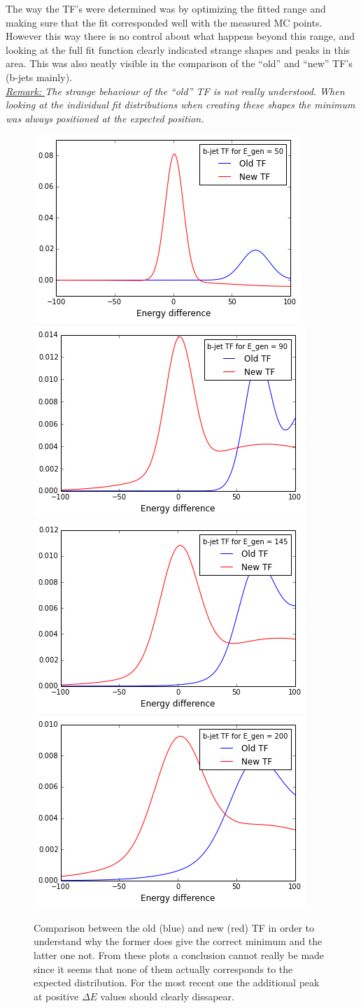 The way the TF's were determined was by optimizing the fitted range and making sure that the fit corresponded well with the measured MC points. However this way there is no control about what happens beyond this range, and looking at the full fit function clearly indicated strange shapes and peaks in this area. This was also neatly visible in the comparison of the ``old'' and ``new'' TF's (b-jets mainly). 
\\
\textit{ \underline{Remark: } The strange behaviour of the ``old'' TF is not really understood. When looking at the individual fit distributions when creating these shapes the minimum was always positioned at the expected position.}
\begin{figure}[h!t]
 \centering
 \includegraphics[width = 0.24 \textwidth]{Chapters/Chapter5_MadWeight/Figures/BJetTF_OldvsNew_Egen50.png}
 \includegraphics[width = 0.24 \textwidth]{Chapters/Chapter5_MadWeight/Figures/BJetTF_OldvsNew_Egen90.png}
 \includegraphics[width = 0.24 \textwidth]{Chapters/Chapter5_MadWeight/Figures/BJetTF_OldvsNew_Egen145.png}
 \includegraphics[width = 0.24 \textwidth]{Chapters/Chapter5_MadWeight/Figures/BJetTF_OldvsNew_Egen200.png}
 \caption{Comparison between the old (blue) and new (red) TF in order to understand why the former does give the correct minimum and the latter one not. From these plots a conclusion cannot really be made since it seems that none of them actually corresponds to the expected distribution. For the most recent one the additional peak at positive $\Delta E$ values should clearly dissapear.}
\end{figure}
